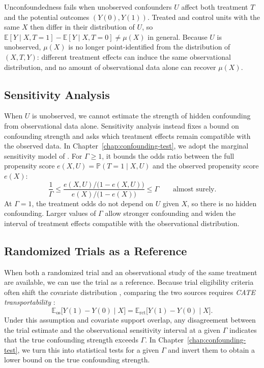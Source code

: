 Unconfoundedness fails when unobserved confounders \(U\) affect both treatment \(T\) and the potential outcomes \((Y(0), Y(1))\). Treated and control units with the same \(X\) then differ in their distribution of \(U\), so \(\mathbb{E}[Y \mid X, T = 1] - \mathbb{E}[Y \mid X, T = 0] \neq \mu(X)\) in general. Because \(U\) is unobserved, \(\mu(X)\) is no longer point-identified from the distribution of \((X, T, Y)\): different treatment effects can induce the same observational distribution, and no amount of observational data alone can recover \(\mu(X)\).

\subsection{Sensitivity Analysis}

When \(U\) is unobserved, we cannot estimate the strength of hidden confounding from observational data alone. Sensitivity analysis \citep{cornfield59} instead fixes a bound on confounding strength and asks which treatment effects remain compatible with the observed data. In Chapter~\ref{chap:confounding-test}, we adopt the marginal sensitivity model of \citet{tan2006distributional}. For \(\Gamma \geq 1\), it bounds the odds ratio between the full propensity score \(e(X, U) = \mathbb{P}(T = 1 \mid X, U)\) and the observed propensity score \(e(X)\):
\[
  \frac{1}{\Gamma}
  \leq
  \frac{e(X, U) / \bigl(1 - e(X, U)\bigr)}{e(X) / \bigl(1 - e(X)\bigr)}
  \leq
  \Gamma
  \qquad\text{almost surely.}
\]
At \(\Gamma = 1\), the treatment odds do not depend on \(U\) given \(X\), so there is no hidden confounding. Larger values of \(\Gamma\) allow stronger confounding and widen the interval of treatment effects compatible with the observational distribution.

\subsection{Randomized Trials as a Reference}

When both a randomized trial and an observational study of the same treatment are available, we can use the trial as a reference. Because trial eligibility criteria often shift the covariate distribution \citep{rothwell2005external}, comparing the two sources requires \emph{CATE transportability} \citep{o2014generalizing,colnet2020causal,degtiar2023review}:
\[
  \mathbb{E}_{\mathrm{os}}\bigl[Y(1) - Y(0) \mid X\bigr]
  =
  \mathbb{E}_{\mathrm{rct}}\bigl[Y(1) - Y(0) \mid X\bigr].
\]
Under this assumption and covariate support overlap, any disagreement between the trial estimate and the observational sensitivity interval at a given \(\Gamma\) indicates that the true confounding strength exceeds \(\Gamma\). In Chapter~\ref{chap:confounding-test}, we turn this into statistical tests for a given \(\Gamma\) and invert them to obtain a lower bound on the true confounding strength.

